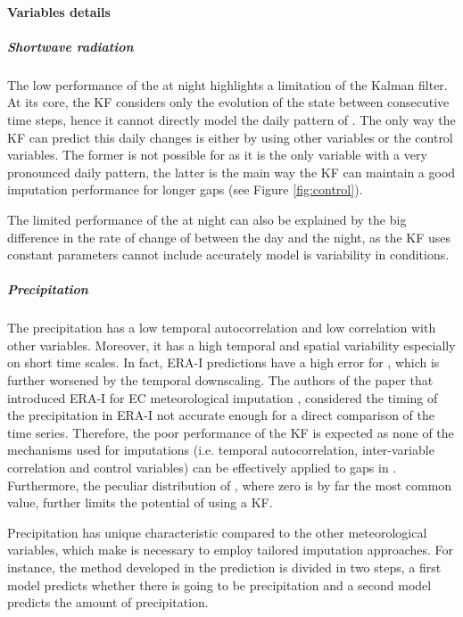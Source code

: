 \documentclass{article}
\begin{document}
\paragraph{Variables details}

\subparagraph{Shortwave radiation} The low performance of the  at night highlights a limitation of the Kalman filter.  At its core, the KF considers only the evolution of the state between consecutive time steps, hence it cannot directly model the daily pattern of . The only way the KF can predict this daily changes is either by using other variables or the control variables. The former is not possible for  as it is the only variable with a very pronounced daily pattern, the latter is the main way the KF can maintain a good imputation performance for longer gaps (see Figure \ref{fig:control}).

The limited performance of the  at night can also be explained by the big difference in the rate of change of  between the day and the night, as the KF uses constant parameters cannot include accurately model is variability in conditions.

\subparagraph{Precipitation} The precipitation has a low temporal autocorrelation and low correlation with other variables. Moreover, it has a high temporal and spatial variability \cite{mital_sequential_2020} especially on short time scales. In fact, ERA-I predictions have a high error for , which is further worsened by the temporal downscaling. The authors of the paper that introduced ERA-I for EC meteorological imputation \cite{vuichard_filling_2015}, considered the timing of the precipitation in ERA-I not accurate enough for a direct comparison of the time series.
Therefore, the poor performance of the KF is expected as none of the mechanisms used for imputations (i.e. temporal autocorrelation, inter-variable correlation and control variables) can be effectively applied to gaps in . Furthermore, the peculiar distribution of , where zero is by far the most common value, further limits the potential of using a KF.

Precipitation has unique characteristic compared to the other meteorological variables, which make is necessary to employ tailored imputation approaches. For instance, the method developed in \cite{chivers_imputation_2020} the prediction is divided in two steps, a first model predicts whether there is going to be precipitation and a second model predicts the amount of precipitation. 
\end{document}
